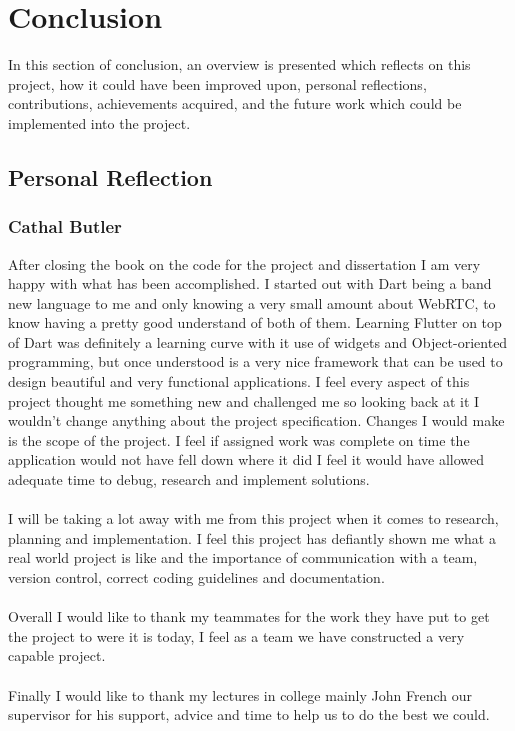 \chapter{Conclusion}
In this section of conclusion, an overview is presented which reflects on this project, how it could have been improved upon, personal reflections, contributions, achievements acquired, and the future work which could be implemented into the project.

\section{Personal Reflection}
\subsection{Cathal Butler}
After closing the book on the code for the project and dissertation I am very happy with what has been accomplished. I started out with Dart being a band new language to me and only knowing a very small amount about WebRTC, to know having a pretty good understand of both of them. Learning Flutter on top of Dart was definitely a learning curve with it use of widgets and Object-oriented programming, but once understood is a very nice framework that can be used to design beautiful and very functional applications. I feel every aspect of this project thought me something new and challenged me so looking back at it I wouldn't change anything about the project specification. Changes I would make is the scope of the project. I feel if assigned work was complete on time the application would not have fell down where it did I feel it would have allowed adequate time to debug, research and implement solutions.
\\\\ I will be taking a lot away with me from this project when it comes to research, planning and implementation. I feel this project has defiantly shown me what a real world project is like and the importance of communication with a team, version control, correct coding guidelines and documentation.
\\\\ Overall I would like to thank my teammates for the work they have put to get the project to were it is today, I feel as a team we have constructed a very capable project. 
\\\\ Finally I would like to thank my lectures in college mainly John French our supervisor for his support, advice and time to help us to do the best we could.    



